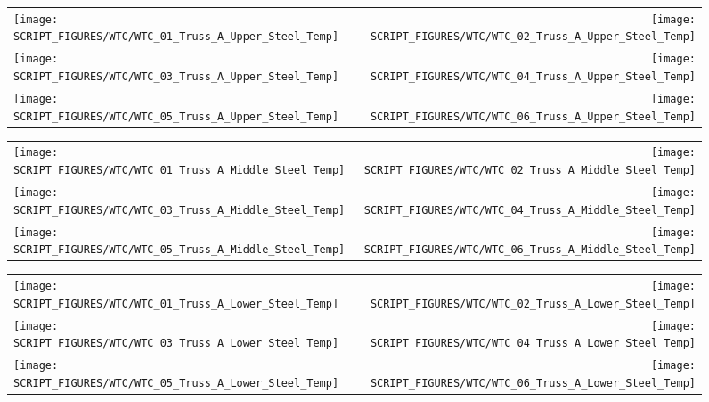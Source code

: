 \begin{figure}[!ht]
\begin{tabular*}{\textwidth}{l@{\extracolsep{\fill}}r}
\texttt{[image: SCRIPT\_FIGURES/WTC/WTC\_01\_Truss\_A\_Upper\_Steel\_Temp]} &
\texttt{[image: SCRIPT\_FIGURES/WTC/WTC\_02\_Truss\_A\_Upper\_Steel\_Temp]} \\
\texttt{[image: SCRIPT\_FIGURES/WTC/WTC\_03\_Truss\_A\_Upper\_Steel\_Temp]} &
\texttt{[image: SCRIPT\_FIGURES/WTC/WTC\_04\_Truss\_A\_Upper\_Steel\_Temp]} \\
\texttt{[image: SCRIPT\_FIGURES/WTC/WTC\_05\_Truss\_A\_Upper\_Steel\_Temp]} &
\texttt{[image: SCRIPT\_FIGURES/WTC/WTC\_06\_Truss\_A\_Upper\_Steel\_Temp]}
\end{tabular*}
\label{NIST_WTC_Truss_A_Upper_Steel_Temp}
\end{figure}

\begin{figure}[!ht]
\begin{tabular*}{\textwidth}{l@{\extracolsep{\fill}}r}
\texttt{[image: SCRIPT\_FIGURES/WTC/WTC\_01\_Truss\_A\_Middle\_Steel\_Temp]} &
\texttt{[image: SCRIPT\_FIGURES/WTC/WTC\_02\_Truss\_A\_Middle\_Steel\_Temp]} \\
\texttt{[image: SCRIPT\_FIGURES/WTC/WTC\_03\_Truss\_A\_Middle\_Steel\_Temp]} &
\texttt{[image: SCRIPT\_FIGURES/WTC/WTC\_04\_Truss\_A\_Middle\_Steel\_Temp]} \\
\texttt{[image: SCRIPT\_FIGURES/WTC/WTC\_05\_Truss\_A\_Middle\_Steel\_Temp]} &
\texttt{[image: SCRIPT\_FIGURES/WTC/WTC\_06\_Truss\_A\_Middle\_Steel\_Temp]}
\end{tabular*}
\label{NIST_WTC_Truss_A_Middle_Steel_Temp}
\end{figure}

\begin{figure}[!ht]
\begin{tabular*}{\textwidth}{l@{\extracolsep{\fill}}r}
\texttt{[image: SCRIPT\_FIGURES/WTC/WTC\_01\_Truss\_A\_Lower\_Steel\_Temp]} &
\texttt{[image: SCRIPT\_FIGURES/WTC/WTC\_02\_Truss\_A\_Lower\_Steel\_Temp]} \\
\texttt{[image: SCRIPT\_FIGURES/WTC/WTC\_03\_Truss\_A\_Lower\_Steel\_Temp]} &
\texttt{[image: SCRIPT\_FIGURES/WTC/WTC\_04\_Truss\_A\_Lower\_Steel\_Temp]} \\
\texttt{[image: SCRIPT\_FIGURES/WTC/WTC\_05\_Truss\_A\_Lower\_Steel\_Temp]} &
\texttt{[image: SCRIPT\_FIGURES/WTC/WTC\_06\_Truss\_A\_Lower\_Steel\_Temp]}
\end{tabular*}
\label{NIST_WTC_Truss_A_Lower_Steel_Temp}
\end{figure}

